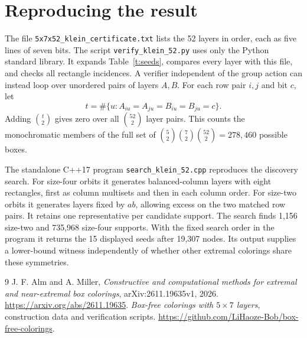 \documentclass[11pt]{article}
\begin{document}
\section*{Reproducing the result}
The file \texttt{5x7x52\_klein\_certificate.txt} lists the 52 layers in order, each as five lines of seven bits. The script \texttt{verify\_klein\_52.py} uses only the Python standard library. It expands Table~\ref{t:seeds}, compares every layer with this file, and checks all rectangle incidences. A verifier independent of the group action can instead loop over unordered pairs of layers $A,B$. For each row pair $i,j$ and bit $c$, let
\[
 t=\#\{u:A_{iu}=A_{ju}=B_{iu}=B_{ju}=c\}.
\]
Adding $\binom{t}{2}$ gives zero over all $\binom{52}{2}$ layer pairs. This counts the monochromatic members of the full set of $\binom52\binom72\binom{52}2=278{,}460$ possible boxes.

The standalone C++17 program \texttt{search\_klein\_52.cpp} reproduces the discovery search. For size-four orbits it generates balanced-column layers with eight rectangles, first as column multisets and then in each column order. For size-two orbits it generates layers fixed by $ab$, allowing excess on the two matched row pairs. It retains one representative per candidate support. The search finds 1,156 size-two and 735,968 size-four supports. With the fixed search order in the program it returns the 15 displayed seeds after 19,307 nodes. Its output supplies a lower-bound witness independently of whether other extremal colorings share these symmetries.

\begin{thebibliography}{9}
 J. F. Alm and A. Miller, \emph{Constructive and computational methods for extremal and near-extremal box colorings}, arXiv:2611.19635v1, 2026. \url{https://arxiv.org/abs/2611.19635}.
 \emph{Box-free colorings with $5\times7$ layers}, construction data and verification scripts. \url{https://github.com/LiHaoze-Bob/box-free-colorings}.
\end{thebibliography}
\end{document}
